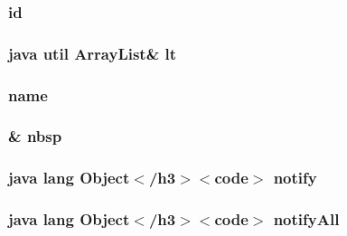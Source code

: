 \hypertarget{_station_group_8html_acf2488b95c97e0378c9bf49de3b50f28}{
\subsubsection[{id}]{\setlength{\rightskip}{0pt plus 5cm}id}}\label{_station_group_8html_acf2488b95c97e0378c9bf49de3b50f28}
\hypertarget{_station_group_8html_a6046ea68583de5557b637104e82142fd}{
\subsubsection[{lt}]{\setlength{\rightskip}{0pt plus 5cm}java util Array\-List\& lt}}\label{_station_group_8html_a6046ea68583de5557b637104e82142fd}
\hypertarget{_station_group_8html_ab74e6bf80237ddc4109968cedc58c151}{
\subsubsection[{name}]{\setlength{\rightskip}{0pt plus 5cm}name}}\label{_station_group_8html_ab74e6bf80237ddc4109968cedc58c151}
\hypertarget{_station_group_8html_aef915316f784c9063d942974538301a6}{
\subsubsection[{nbsp}]{\setlength{\rightskip}{0pt plus 5cm}\& nbsp}}\label{_station_group_8html_aef915316f784c9063d942974538301a6}
\hypertarget{_station_group_8html_ae99ae10b5010594dbda4794e02db271b}{
\subsubsection[{notify}]{\setlength{\rightskip}{0pt plus 5cm}java lang Object$<$/h3$>$$<$code$>$ notify}}\label{_station_group_8html_ae99ae10b5010594dbda4794e02db271b}
\hypertarget{_station_group_8html_a1279357e6e09e33e75b55eb05fdb6436}{
\subsubsection[{notify\-All}]{\setlength{\rightskip}{0pt plus 5cm}java lang Object$<$/h3$>$$<$code$>$ notify\-All}}\label{_station_group_8html_a1279357e6e09e33e75b55eb05fdb6436}

